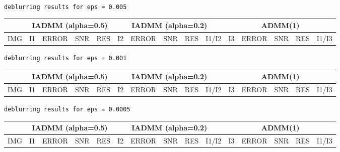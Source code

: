 \documentclass[a4paper]{article}
\begin{document}
  \small
  \begin{center}{\tt deblurring results for eps = 0.005}\end{center}
  {\tt \noindent\begin{tabular}{|r|rrrr|rrrrr|rrrrr|}
    \cline{2-15}
    \multicolumn{1}{c|}{} & \multicolumn{4}{c|}{IADMM (alpha=0.5)}
        & \multicolumn{5}{c|}{IADMM (alpha=0.2)} & \multicolumn{5}{c|}{ADMM(1)}\\
    \hline
    \rowcolor[gray]{0.9}
    IMG & I1 & ERROR & SNR & RES & I2 & ERROR & SNR & RES & I1/I2 & I3 & ERROR & SNR & RES & I1/I3 \\
    
    \hline
  \end{tabular}}

  \bigskip
  \begin{center}{\tt deblurring results for eps = 0.001}\end{center}
  {\tt \noindent\begin{tabular}{|r|rrrr|rrrrr|rrrrr|}
    \cline{2-15}
    \multicolumn{1}{c|}{} & \multicolumn{4}{c|}{IADMM (alpha=0.5)}
        & \multicolumn{5}{c|}{IADMM (alpha=0.2)} & \multicolumn{5}{c|}{ADMM(1)}\\
    \hline
    \rowcolor[gray]{0.9}
    IMG & I1 & ERROR & SNR & RES & I2 & ERROR & SNR & RES & I1/I2 & I3 & ERROR & SNR & RES & I1/I3 \\
    
    \hline
  \end{tabular}}

  \bigskip
  \begin{center}{\tt deblurring results for eps = 0.0005}\end{center}
  {\tt \noindent\begin{tabular}{|r|rrrr|rrrrr|rrrrr|}
    \cline{2-15}
    \multicolumn{1}{c|}{} & \multicolumn{4}{c|}{IADMM (alpha=0.5)}
        & \multicolumn{5}{c|}{IADMM (alpha=0.2)} & \multicolumn{5}{c|}{ADMM(1)}\\
    \hline
    \rowcolor[gray]{0.9}
    IMG & I1 & ERROR & SNR & RES & I2 & ERROR & SNR & RES & I1/I2 & I3 & ERROR & SNR & RES & I1/I3 \\
    
    \hline
  \end{tabular}}
\end{document}
